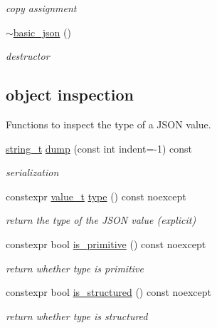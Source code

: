 \begin{DoxyCompactItemize}
\begin{DoxyCompactList}\small\item\em copy assignment \end{DoxyCompactList}\item 
\mbox{\hyperlink{classnlohmann_1_1basic__json_a42347bbce75ba5571e292a3540af30e0}{$\sim$basic\+\_\+json}} ()
\begin{DoxyCompactList}\small\item\em destructor \end{DoxyCompactList}\end{DoxyCompactItemize}
\subsection*{object inspection}
\label{_amgrpbbb01a37b8f261ae5b5799058dcac1a0}%
Functions to inspect the type of a J\+S\+ON value. \begin{DoxyCompactItemize}
\item 
\mbox{\hyperlink{classnlohmann_1_1basic__json_a61f8566a1a85a424c7266fb531dca005}{string\+\_\+t}} \mbox{\hyperlink{classnlohmann_1_1basic__json_a5319dc1bb9dfe19ce7ff559aaded3422}{dump}} (const int indent=-\/1) const
\begin{DoxyCompactList}\small\item\em serialization \end{DoxyCompactList}\item 
constexpr \mbox{\hyperlink{namespacenlohmann_1_1detail_a90aa5ef615aa8305e9ea20d8a947980f}{value\+\_\+t}} \mbox{\hyperlink{classnlohmann_1_1basic__json_a2b2d781d7f2a4ee41bc0016e931cadf7}{type}} () const noexcept
\begin{DoxyCompactList}\small\item\em return the type of the J\+S\+ON value (explicit) \end{DoxyCompactList}\item 
constexpr bool \mbox{\hyperlink{classnlohmann_1_1basic__json_a6362b88718eb5c6d4fed6a61eed44b95}{is\+\_\+primitive}} () const noexcept
\begin{DoxyCompactList}\small\item\em return whether type is primitive \end{DoxyCompactList}\item 
constexpr bool \mbox{\hyperlink{classnlohmann_1_1basic__json_a9f68a0af820c3ced7f9d17851ce4c22d}{is\+\_\+structured}} () const noexcept
\begin{DoxyCompactList}\small\item\em return whether type is structured \end{DoxyCompactList}\item 

\end{DoxyCompactItemize}
